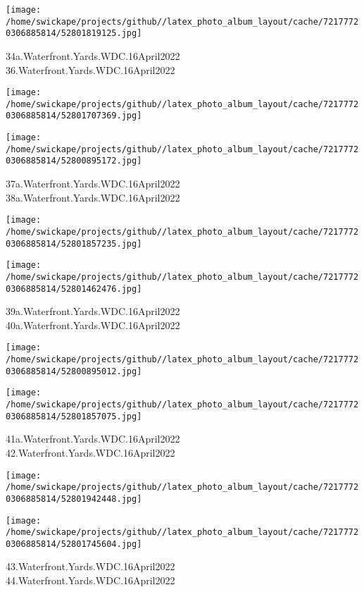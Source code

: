 \documentclass[10pt,letterpaper]{article}
\begin{document}
\vspace{0.25in}
\texttt{[image: /home/swickape/projects/github//latex\_photo\_album\_layout/cache/72177720306885814/52801819125.jpg]}

34a.Waterfront.Yards.WDC.16April2022\\
36.Waterfront.Yards.WDC.16April2022
\pagebreak

\texttt{[image: /home/swickape/projects/github//latex\_photo\_album\_layout/cache/72177720306885814/52801707369.jpg]}

\vspace{0.25in}
\texttt{[image: /home/swickape/projects/github//latex\_photo\_album\_layout/cache/72177720306885814/52800895172.jpg]}

37a.Waterfront.Yards.WDC.16April2022\\
38a.Waterfront.Yards.WDC.16April2022
\pagebreak

\texttt{[image: /home/swickape/projects/github//latex\_photo\_album\_layout/cache/72177720306885814/52801857235.jpg]}

\vspace{0.25in}
\texttt{[image: /home/swickape/projects/github//latex\_photo\_album\_layout/cache/72177720306885814/52801462476.jpg]}

39a.Waterfront.Yards.WDC.16April2022\\
40a.Waterfront.Yards.WDC.16April2022
\pagebreak

\texttt{[image: /home/swickape/projects/github//latex\_photo\_album\_layout/cache/72177720306885814/52800895012.jpg]}

\vspace{0.25in}
\texttt{[image: /home/swickape/projects/github//latex\_photo\_album\_layout/cache/72177720306885814/52801857075.jpg]}

41a.Waterfront.Yards.WDC.16April2022\\
42.Waterfront.Yards.WDC.16April2022
\pagebreak

\texttt{[image: /home/swickape/projects/github//latex\_photo\_album\_layout/cache/72177720306885814/52801942448.jpg]}

\vspace{0.25in}
\texttt{[image: /home/swickape/projects/github//latex\_photo\_album\_layout/cache/72177720306885814/52801745604.jpg]}

43.Waterfront.Yards.WDC.16April2022\\
44.Waterfront.Yards.WDC.16April2022
\pagebreak
\end{document}

